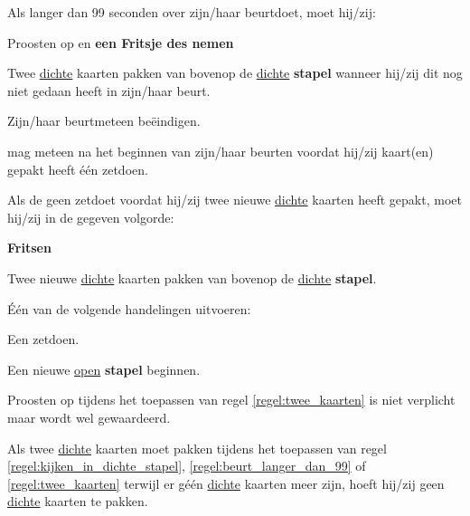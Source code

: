 \vervolgLijst{}
    \item Als \eenSpeler langer dan 99 seconden over zijn/haar beurt\footnotemark[1] doet, moet hij/zij:
    \puntLijst{}
        \item Proosten op  en \textbf{een Fritsje des nemen}\footnotemark[2]
        \item Twee \ul{dichte} kaarten pakken van bovenop de \ul{dichte} \textbf{stapel} wanneer hij/zij dit nog niet gedaan heeft in zijn/haar beurt.
        \item Zijn/haar beurt\footnotemark[1] meteen beëindigen.
    \eindPuntLijst{}
    \label{regel:beurt_langer_dan_99}
\eindLijst{}


\vervolgLijst{}
    \item \EenSpeler mag meteen na het beginnen van zijn/haar beurt\footnotemark[1] en voordat hij/zij kaart(en) gepakt heeft \'e\'en zet\footnotemark[3] doen.
    \label{regel:zet_zonder_pakker}
\eindLijst{}

\vervolgLijst{}
    \item \label{regel:twee_kaarten} Als de \huidigeSpeler geen zet\footnotemark[3] doet voordat hij/zij twee nieuwe \ul{dichte} kaarten heeft gepakt, moet hij/zij in de gegeven volgorde:
    \puntLijst{}
        \item \textbf{Fritsen}
        \item Twee nieuwe \ul{dichte} kaarten pakken van bovenop de \ul{dichte} \textbf{stapel}.
        \item Één van de volgende handelingen uitvoeren:
        \numeriekeLijst{}
            \item Een zet\footnotemark[3] doen.
            \item Een nieuwe \ul{open} \textbf{stapel} beginnen.
        \eindNumeriekeLijst{}
     \eindPuntLijst{}
\eindLijst{}

\vervolgLijst{}
    \item Proosten op  tijdens het toepassen van regel \ref{regel:twee_kaarten} is niet verplicht maar wordt wel gewaardeerd.
\eindLijst{}

\vervolgLijst{}
    \item Als \eenSpeler twee \ul{dichte} kaarten moet pakken tijdens het toepassen van regel \ref{regel:kijken_in_dichte_stapel}, \ref{regel:beurt_langer_dan_99} of \ref{regel:twee_kaarten} terwijl er g\'e\'en \ul{dichte} kaarten meer zijn, hoeft hij/zij geen \ul{dichte} kaarten te pakken.
    \label{item:geen_kaart_1}
\eindLijst{}


